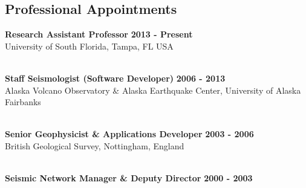 \documentclass[margin,line]{res}
\begin{document}
\begin{resume}
\section{\sc Professional Appointments}
%
{\bf Research Assistant Professor} \hfill {\bf 2013 - Present} \\
University of South Florida, Tampa, FL USA\\
\begin{comment}
Built the computational infrastructure for the USF Seismology group. Taught classes in volcano
seismology, programming, seismic data analysis and digital signal processing.
Installed seismic and infrasound stations on Masaya volcano and at Kennedy Space Center. Investigating techniques to automatically detect, locate 
and characterize volcano-seismic signals including tremor, swarms, rockfalls, 
pyroclastic flows and lahars.   
\end{comment}
\\
%
{\bf Staff Seismologist (Software Developer)} \hfill {\bf 2006 - 2013} \\
Alaska Volcano Observatory & Alaska Earthquake Center, University of Alaska Fairbanks\\
\begin{comment}
Developed near-real-time, database-driven seismic monitoring software for the Alaska Volcano
Observatory and Alaska Earthquake Center. Investigated algorithms to detect earthquake swarms
at several volcanoes. Participated in volcano and earthquake monitoring, including the 2009
Redoubt eruption. 
\end{comment}
\\
%
{\bf Senior Geophysicist \& Applications Developer} \hfill {\bf 2003 - 2006} \\
British Geological Survey, Nottingham, England \\
\begin{comment}
A wide variety of geophysical surveying projects involving airborne geophysics, resistivity,
refraction seismology, ground penetrating radar. Broad portfolio of software development
projects including writing software to control a robot to scan core samples.
Wrote training manuals for airborne geophysics. Periodically covered for scientists on break
at the Montserrat Volcano Observatory. Further upgraded MVO seismic monitoring systems in 2004.
\end{comment}
\\
%
{\bf Seismic Network Manager \& Deputy Director} \hfill {\bf 2000 - 2003} \\

\end{resume}
\end{document}

